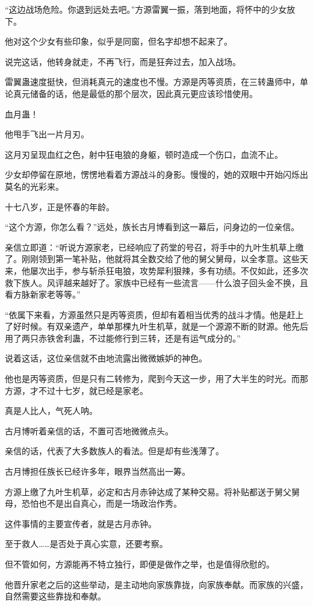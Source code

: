 \begin{this_body}
“这边战场危险。你退到远处去吧。”方源雷翼一振，落到地面，将怀中的少女放下。

他对这个少女有些印象，似乎是同窗，但名字却想不起来了。

说完这话，他转身就走，不再飞行，而是狂奔过去，加入战场。

雷翼蛊速度挺快，但消耗真元的速度也不慢。方源是丙等资质，在三转蛊师中，单论真元储备的话，他是最低的那个层次，因此真元更应该珍惜使用。

血月蛊！

他甩手飞出一片月刃。

这月刃呈现血红之色，射中狂电狼的身躯，顿时造成一个伤口，血流不止。

少女却停留在原地，愣愣地看着方源战斗的身影。慢慢的，她的双眼中开始闪烁出莫名的光彩来。

十七八岁，正是怀春的年龄。

“这个方源，你怎么看？”远处，族长古月博看到这一幕后，问身边的一位亲信。

亲信立即道：“听说方源家老，已经响应了药堂的号召，将手中的九叶生机草上缴了。刚刚领到第一笔补贴，他就将其全数交给了他的舅父舅母，以全孝意。这些天来，他屡次出手，参与斩杀狂电狼，攻势犀利狠辣，多有功绩。不仅如此，还多次救下族人。风评越来越好了。家族中已经有一些流言——什么浪子回头金不换，且看方脉新家老等等。”

“依属下来看，方源虽然只是丙等资质，但却有着相当优秀的战斗才情。他是赶上了好时候。有双亲遗产，单单那棵九叶生机草，就是一个源源不断的财源。他先后用了两只赤铁舍利蛊，不过能修行到三转，还是有运气成分的。”

说着这话，这位亲信就不由地流露出微微嫉妒的神色。

他也是丙等资质，但是只有二转修为，爬到今天这一步，用了大半生的时光。而那方源，才不过十七岁，就已经是家老。

真是人比人，气死人呐。

古月博听着亲信的话，不置可否地微微点头。

亲信的话，代表了大多数族人的看法。但是却有些浅薄了。

古月博担任族长已经许多年，眼界当然高出一筹。

方源上缴了九叶生机草，必定和古月赤钟达成了某种交易。将补贴都送于舅父舅母，恐怕也不是出自真心，而是一场政治作秀。

这件事情的主要宣传者，就是古月赤钟。

至于救人……是否处于真心实意，还要考察。

但不管如何，方源能再不特立独行，即便是做作之举，也是值得欣慰的。

他晋升家老之后的这些举动，是主动地向家族靠拢，向家族奉献。而家族的兴盛，自然需要这些靠拢和奉献。


\end{this_body}

